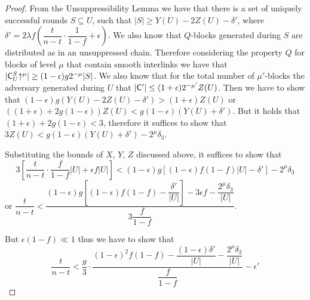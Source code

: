 \begin{proof}
  From the Unsuppressibility Lemma we have that there is a set of uniquely
  successful rounds $S \subseteq U$, such that
  $\lvert S \rvert \geq Y(U) - 2Z(U) - \delta'$, where
  $\delta' = 2 \lambda f (\dfrac{t}{n-t} \cdot \dfrac{1}{1-f} + \epsilon)$.
  We also know that $Q$-blocks generated during $S$ are distributed as in an
  unsuppressed chain. Therefore considering the property $Q$ for blocks of
  level $\mu$ that contain smooth interlinks we have that
  $\lvert \mathsf{C}^S_U\negthickspace\uparrow^{\mu} \rvert \geq (1-\epsilon)g2^{-\mu} \lvert S \rvert$.
  We also know that for the total number of $\mu'$-blocks the adversary
  generated during $U$ that
  $\lvert \mathsf{C}' \rvert \leq (1+\epsilon)2^{-\mu'}Z(U)$.
  Then we have to show that
  $(1-\epsilon)g (Y(U) - 2Z(U) - \delta' ) > (1+\epsilon)Z(U)$ or
  $((1+\epsilon)+2g(1-\epsilon))Z(U) < g(1-\epsilon)(Y(U) + \delta')$.
  But it holds that $ (1+\epsilon)+2g(1-\epsilon) < 3$, therefore it suffices to show that
  $3Z(U) < g(1-\epsilon)(Y(U) + \delta') - 2^\mu \delta_3$.

Substituting the bounds of $X$, $Y$, $Z$ discussed above, it suffices to show that
\begin{equation*}
    3[\dfrac{t}{n-t} \cdot \dfrac{f}{1-f} \lvert U \rvert + \epsilon f \lvert U \rvert ] < (1- \epsilon)g[ (1-\epsilon)f(1-f) \lvert U \rvert - \delta'] - 2^\mu \delta_3
\end{equation*} or
$\dfrac{t}{n-t} < \dfrac{  (1- \epsilon)g[ (1-\epsilon)f(1-f) - \dfrac{\delta'}{\lvert U \rvert} ] - 3 \epsilon f - \dfrac{2^\mu \delta_3}{\lvert U \rvert} }  { 3\dfrac{f}{1-f}}$.

But $\epsilon(1-f) \ll 1$
thus we have to show that
\begin{equation}\label{eq:lemma_eq1}
    \dfrac{t}{n-t} < \dfrac{g}{3} \cdot \dfrac{(1-\epsilon)^2 f(1-f) - \dfrac{(1-\epsilon)\delta'}{\lvert U \rvert} - \dfrac{2^\mu \delta_3}{\lvert U \rvert} }{\dfrac{f}{1-f}} - \epsilon'
\end{equation}


\end{proof}
